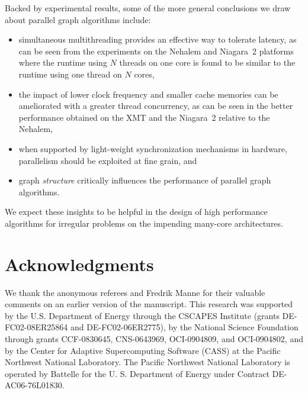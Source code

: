 \documentclass{article}
\begin{document}
Backed by experimental results, some of the more general conclusions we draw about
parallel graph algorithms include:
\begin{itemize}
\item simultaneous multithreading provides an effective way to tolerate latency, as can be seen from  
the experiments on the Nehalem and Niagara~2 platforms where the runtime 
using $N$ threads on one core is found to be similar to the runtime using one thread on $N$ cores, 
\item the impact of lower clock frequency and smaller cache memories can be ameliorated with a greater thread concurrency, 
as can be seen in the better performance obtained on the XMT and the Niagara~2 relative to the Nehalem,
\item when supported by light-weight synchronization mechanisms in hardware, 
parallelism should be exploited at fine grain, and
\item graph {\em structure} critically influences the performance of parallel graph algorithms.
\end{itemize}
We expect these insights to be helpful in the design of high performance algorithms for
irregular problems on the impending many-core architectures. 

\section*{Acknowledgments}
We thank the anonymous referees and Fredrik Manne for their valuable 
comments on an earlier version of the manuscript. This research was supported by the 
U.S. Department of Energy through the CSCAPES Institute (grants
DE-FC02-08ER25864 and DE-FC02-06ER2775), by the National Science
Foundation through grants CCF-0830645, CNS-0643969, OCI-0904809,
and OCI-0904802, and by the Center for Adaptive Supercomputing
Software (CASS) at the Pacific Northwest National Laboratory. The
Pacific Northwest National Laboratory is operated by Battelle for the
U. S. Department of Energy under Contract DE-AC06-76L01830.



\end{document}

